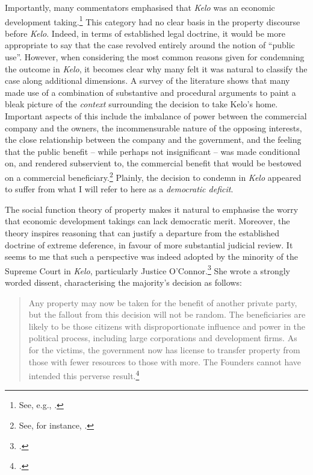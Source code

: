 Importantly, many commentators emphasised that {\it Kelo} was an economic development taking.\footnote{See, e.g., \cite{somin07,cohen06}.} This category had no clear basis in the property discourse before {\it Kelo}. Indeed, in terms of established legal doctrine, it would be more appropriate to say that the case revolved entirely around the notion of ``public use''. However, when considering the most common reasons given for condemning the outcome in {\it Kelo}, it becomes clear why many felt it was natural to classify the case along additional dimensions. A survey of the literature shows that many made use of a combination of substantive and procedural arguments to paint a bleak picture of the {\it context} surrounding the decision to take Kelo's home. Important aspects of this include the imbalance of power between the commercial company and the owners, the incommensurable nature of the opposing interests, the close relationship between the company and the government, and the feeling that the public benefit -- while perhaps not insignificant -- was made conditional on, and rendered subservient to, the commercial benefit that would be bestowed on a commercial beneficiary.\footnote{See, for instance, \cite{underkuffler06,somin07,sandefur06,cohen06,hafetz09,hudson10}.} Plainly, the decision to condemn in {\it Kelo} appeared to suffer from what I will refer to here as a {\it democratic deficit}.

The social function theory of property makes it natural to emphasise the worry that economic development takings can lack democratic merit. Moreover, the theory inspires reasoning that can justify a departure from the established doctrine of extreme deference, in favour of more substantial judicial review. It seems to me that such a perspective was indeed adopted by the minority of the Supreme Court in {\it Kelo}, particularly Justice O'Connor.\footnote{\cite[494-505]{kelo05}.} She wrote a strongly worded dissent, characterising the majority's decision as follows:

\begin{quote}
Any property may now be taken for the benefit of another private party, but the fallout from this decision will not be random. The beneficiaries are likely to be those citizens with disproportionate influence and power in the political process, including large corporations and development firms. As for the victims, the government now has license to transfer property from those with fewer resources to those with more. The Founders cannot have intended this perverse result.\footcite[505]{kelo05}
\end{quote}

